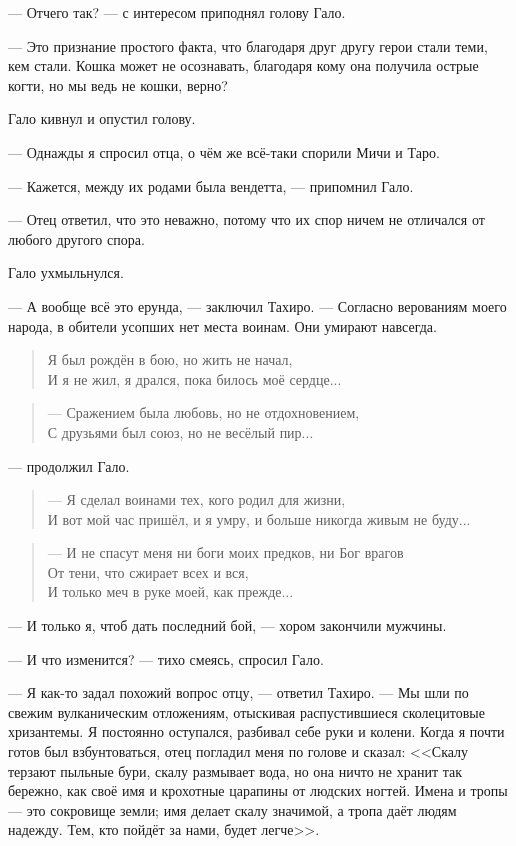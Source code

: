 --- Отчего так? --- с интересом приподнял голову Гало.

--- Это признание простого факта, что благодаря друг другу герои стали теми, кем стали.
Кошка может не осознавать, благодаря кому она получила острые когти, но мы ведь не кошки, верно?

Гало кивнул и опустил голову.

--- Однажды я спросил отца, о чём же всё-таки спорили Мичи и Таро.

--- Кажется, между их родами была вендетта, --- припомнил Гало.

--- Отец ответил, что это неважно, потому что их спор ничем не отличался от любого другого спора.

Гало ухмыльнулся.

--- А вообще всё это ерунда, --- заключил Тахиро.
--- Согласно верованиям моего народа, в обители усопших нет места воинам.
Они умирают навсегда.

\begin{verse}
Я был рождён в бою, но жить не начал,\\
И я не жил, я дрался, пока билось моё сердце...
\end{verse}

\begin{verse}
--- Сражением была любовь, но не отдохновением,\\
С друзьями был союз, но не весёлый пир...
\end{verse}

---  продолжил Гало.

\begin{verse}
--- Я сделал воинами тех, кого родил для жизни,\\
И вот мой час пришёл, и я умру, и больше никогда живым не буду...
\end{verse}

\begin{verse}
--- И не спасут меня ни боги моих предков, ни Бог врагов\\
От тени, что сжирает всех и вся,\\
И только меч в руке моей, как прежде...
\end{verse}

--- И только я, чтоб дать последний бой, --- хором закончили мужчины.

--- И что изменится? --- тихо смеясь, спросил Гало.

--- Я как-то задал похожий вопрос отцу, --- ответил Тахиро.
--- Мы шли по свежим вулканическим отложениям, отыскивая распустившиеся сколецитовые хризантемы.
Я постоянно оступался, разбивал себе руки и колени.
Когда я почти готов был взбунтоваться, отец погладил меня по голове и сказал:
<<Скалу терзают пыльные бури, скалу размывает вода, но она ничто не хранит так бережно, как своё имя и крохотные царапины от людских ногтей.
Имена и тропы --- это сокровище земли;
имя делает скалу значимой, а тропа даёт людям надежду.
Тем, кто пойдёт за нами, будет легче>>.

